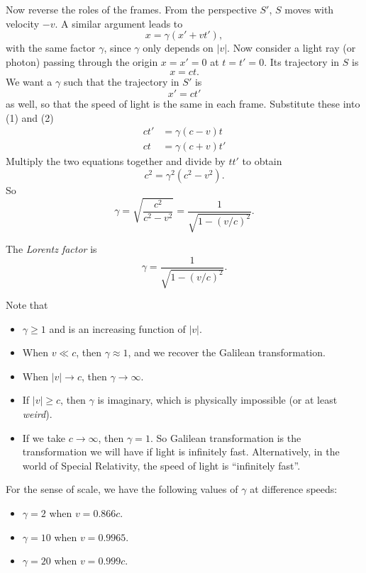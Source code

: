 \documentclass[a4paper]{article}
\begin{document}
Now reverse the roles of the frames. From the perspective $S'$, $S$ moves with velocity $-v$. A similar argument leads to
\[
  x = \gamma(x' + vt'),\tag{2}
\]
with the same factor $\gamma$, since $\gamma$ only depends on $|v|$. Now consider a light ray (or photon) passing through the origin $x = x' = 0$ at $t = t' = 0$. Its trajectory in $S$ is
\[
  x = ct.
\]
We want a $\gamma$ such that the trajectory in $S'$ is 
\[
  x' = ct'
\]
as well, so that the speed of light is the same in each frame. Substitute these into (1) and (2)
\begin{align*}
  ct' &= \gamma(c - v)t\\
  ct &= \gamma(c + v)t'
\end{align*}
Multiply the two equations together and divide by $tt'$ to obtain
\[
  c^2 = \gamma^2(c^2 - v^2).
\]
So
\[
  \gamma = \sqrt{\frac{c^2}{c^2 - v^2}} = \frac{1}{\sqrt{1 - (v/c)^2}}.
\]
\begin{defi}
  The \emph{Lorentz factor} is
  \[
    \gamma = \frac{1}{\sqrt{1 - (v/c)^2}}.
  \]
\end{defi}
Note that
\begin{itemize}
  \item $\gamma \geq 1$ and is an increasing function of $|v|$.
  \item When $v \ll c$, then $\gamma \approx 1$, and we recover the Galilean transformation.
  \item When $|v|\to c$, then $\gamma\to \infty$.
  \item If $|v| \geq c$, then $\gamma$ is imaginary, which is physically impossible (or at least \emph{weird}).
  \item If we take $c\to \infty$, then $\gamma = 1$. So Galilean transformation is the transformation we will have if light is infinitely fast. Alternatively, in the world of Special Relativity, the speed of light is ``infinitely fast''.
\end{itemize}
\begin{center}
\end{center}
For the sense of scale, we have the following values of $\gamma$ at difference speeds:
\begin{itemize}
  \item $\gamma = 2$ when $v = 0.866c$.
  \item $\gamma = 10$ when $v = 0.9965$.
  \item $\gamma = 20$ when $v = 0.999c$.
\end{itemize}
\end{document}
